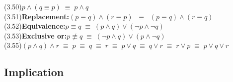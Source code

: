 \documentclass[fleqn, leqno]{article}
\newcommand{\lgap}{2pt}                             %
\newcommand{\equivs}{\ensuremath{\;\equiv\;}}       %
\newcommand{\equivss}{\ensuremath{\;\;\equiv\;\;}}  %
\newcommand{\nequiv}{\ensuremath{\not\equiv}}       %
\begin{document}
\begin{tabbing}
(3.50)\>$p\land (q\equiv p)\equivs p\land q$\\[\lgap]
(3.51)\>\textbf{Replacement:}\quad $(p \equiv q) \land (r \equiv p) \equivss (p \equiv q) \land (r \equiv q)$\\[\lgap]
(3.52)\>\textbf{Equivalence:}\quad $p \equiv q \equivs (p \land q) \lor (\neg p \land \neg q)$\\[\lgap]
(3.53)\>\textbf{Exclusive or:}\quad $p \nequiv q \equivs (\neg p \land q) \lor (p \land \neg q)$\\[\lgap]
(3.55)\>$(p\land q)\land r \equivs p \equivs q \equivs r \equivs p\lor q \equivs q\lor r \equivs r\lor p \equivs p \lor q\lor r$\\
\end{tabbing}


\subsection*{Implication}
\end{document}
